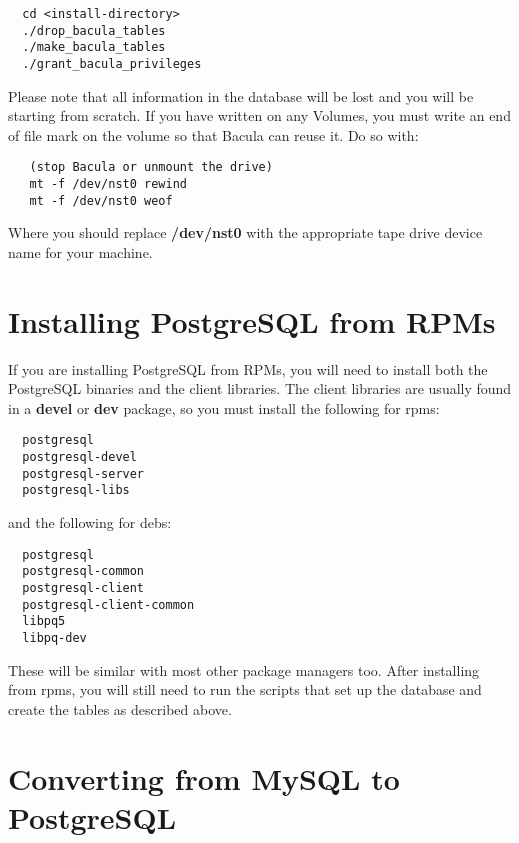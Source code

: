 \footnotesize
\begin{verbatim}
  cd <install-directory>
  ./drop_bacula_tables
  ./make_bacula_tables
  ./grant_bacula_privileges
\end{verbatim}
\normalsize

Please note that all information in the database will be lost and you will be
starting from scratch. If you have written on any Volumes, you must write an
end of file mark on the volume so that Bacula can reuse it. Do so with: 

\footnotesize
\begin{verbatim}
   (stop Bacula or unmount the drive)
   mt -f /dev/nst0 rewind
   mt -f /dev/nst0 weof
\end{verbatim}
\normalsize

Where you should replace {\bf /dev/nst0} with the appropriate tape drive
device name for your machine. 

\section{Installing PostgreSQL from RPMs}
If you are installing PostgreSQL from RPMs, you will need to install
both the PostgreSQL binaries and the client libraries.  The client
libraries are usually found in a {\bf devel} or {\bf dev} package, so you must
install the following for rpms:

\footnotesize
\begin{verbatim}
  postgresql
  postgresql-devel
  postgresql-server
  postgresql-libs
\end{verbatim}
\normalsize


and the following for debs:

\footnotesize
\begin{verbatim}
  postgresql
  postgresql-common
  postgresql-client
  postgresql-client-common
  libpq5
  libpq-dev
\end{verbatim}
\normalsize


These will be similar with most other package managers too.  After
installing from rpms, you will still need to run the scripts that set up
the database and create the tables as described above.


\section{Converting from MySQL to PostgreSQL}

